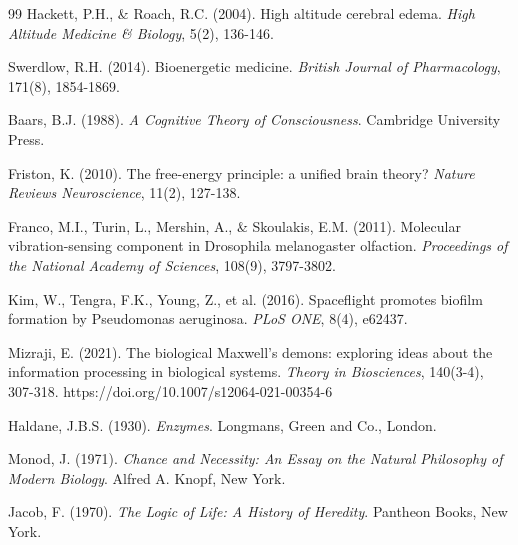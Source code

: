 \documentclass[11pt,a4paper]{article}
\begin{document}
\begin{thebibliography}{99}
Hackett, P.H., \& Roach, R.C. (2004). High altitude cerebral edema. \textit{High Altitude Medicine \& Biology}, 5(2), 136-146.

Swerdlow, R.H. (2014). Bioenergetic medicine. \textit{British Journal of Pharmacology}, 171(8), 1854-1869.

Baars, B.J. (1988). \textit{A Cognitive Theory of Consciousness}. Cambridge University Press.

Friston, K. (2010). The free-energy principle: a unified brain theory? \textit{Nature Reviews Neuroscience}, 11(2), 127-138.

Franco, M.I., Turin, L., Mershin, A., \& Skoulakis, E.M. (2011). Molecular vibration-sensing component in Drosophila melanogaster olfaction. \textit{Proceedings of the National Academy of Sciences}, 108(9), 3797-3802.

Kim, W., Tengra, F.K., Young, Z., et al. (2016). Spaceflight promotes biofilm formation by Pseudomonas aeruginosa. \textit{PLoS ONE}, 8(4), e62437.

Mizraji, E. (2021). The biological Maxwell's demons: exploring ideas about the information processing in biological systems. \textit{Theory in Biosciences}, 140(3-4), 307-318. https://doi.org/10.1007/s12064-021-00354-6

Haldane, J.B.S. (1930). \textit{Enzymes}. Longmans, Green and Co., London.

Monod, J. (1971). \textit{Chance and Necessity: An Essay on the Natural Philosophy of Modern Biology}. Alfred A. Knopf, New York.

Jacob, F. (1970). \textit{The Logic of Life: A History of Heredity}. Pantheon Books, New York.

\end{thebibliography}
\end{document}
